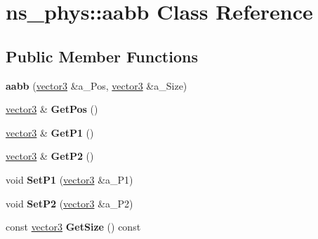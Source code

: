 \hypertarget{classns__phys_1_1aabb}{}\section{ns\+\_\+phys\+:\+:aabb Class Reference}
\label{classns__phys_1_1aabb}
\subsection*{Public Member Functions}
\begin{DoxyCompactItemize}
\item 
{\bfseries aabb} (\hyperlink{classns__phys_1_1vector3}{vector3} \&a\+\_\+\+Pos, \hyperlink{classns__phys_1_1vector3}{vector3} \&a\+\_\+\+Size)\hypertarget{classns__phys_1_1aabb_a3b73281ec4331aa51c97866be4bae1cd}{}\label{classns__phys_1_1aabb_a3b73281ec4331aa51c97866be4bae1cd}

\item 
\hyperlink{classns__phys_1_1vector3}{vector3} \& {\bfseries Get\+Pos} ()\hypertarget{classns__phys_1_1aabb_a573bb758de8e0352f6123871d4cfe4bf}{}\label{classns__phys_1_1aabb_a573bb758de8e0352f6123871d4cfe4bf}

\item 
\hyperlink{classns__phys_1_1vector3}{vector3} \& {\bfseries Get\+P1} ()\hypertarget{classns__phys_1_1aabb_ac225e4d8455f8dd9a0e169beede84a1a}{}\label{classns__phys_1_1aabb_ac225e4d8455f8dd9a0e169beede84a1a}

\item 
\hyperlink{classns__phys_1_1vector3}{vector3} \& {\bfseries Get\+P2} ()\hypertarget{classns__phys_1_1aabb_aa19d71f350fa2dc5208b10a5852fe4f1}{}\label{classns__phys_1_1aabb_aa19d71f350fa2dc5208b10a5852fe4f1}

\item 
void {\bfseries Set\+P1} (\hyperlink{classns__phys_1_1vector3}{vector3} \&a\+\_\+\+P1)\hypertarget{classns__phys_1_1aabb_a3fa929f6a7b4443da9ccf297dcb219b7}{}\label{classns__phys_1_1aabb_a3fa929f6a7b4443da9ccf297dcb219b7}

\item 
void {\bfseries Set\+P2} (\hyperlink{classns__phys_1_1vector3}{vector3} \&a\+\_\+\+P2)\hypertarget{classns__phys_1_1aabb_a6875fbed8d14f954a355dde4286e1174}{}\label{classns__phys_1_1aabb_a6875fbed8d14f954a355dde4286e1174}

\item 
const \hyperlink{classns__phys_1_1vector3}{vector3} {\bfseries Get\+Size} () const \hypertarget{classns__phys_1_1aabb_aff961286392be481dec79f46d6de4a9d}{}\label{classns__phys_1_1aabb_aff961286392be481dec79f46d6de4a9d}


\end{DoxyCompactItemize}
